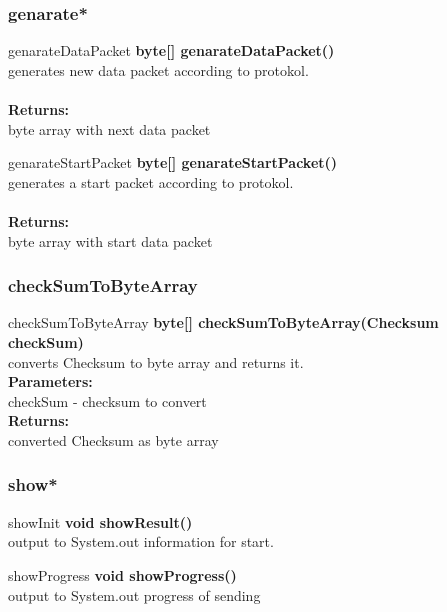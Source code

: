 \documentclass[12pt]{article}
\begin{document}
\subsubsection{genarate*}
\begin{mybox}[colback=white]{genarateDataPacket}
\textbf{byte[] genarateDataPacket()} \\
generates new data packet according to protokol. \\
\\
\textbf{Returns:} \\
byte array with next data packet
\end{mybox}

\begin{mybox}[colback=white]{genarateStartPacket}
\textbf{byte[] genarateStartPacket()} \\
generates a start packet according to protokol. \\
\\
\textbf{Returns:} \\
byte array with start data packet
\end{mybox}

\subsubsection{checkSumToByteArray}
\begin{mybox}[colback=white]{checkSumToByteArray}
\textbf{byte[] checkSumToByteArray(Checksum checkSum)} \\
converts Checksum to byte array and returns it.
\\
\textbf{Parameters:} \\
checkSum - checksum to convert\\
\textbf{Returns:} \\
converted Checksum as byte array
\end{mybox}

\subsubsection{show*}
\begin{mybox}[colback=white]{showInit}
\textbf{void showResult()} \\
output to System.out information for start. 
\end{mybox}

\begin{mybox}[colback=white]{showProgress}
\textbf{void showProgress()} \\
output to System.out progress of sending
\end{mybox}
\end{document}
